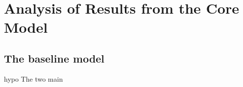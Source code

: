 \chapter{Analysis of Results from the Core Model} \label{chapter-analysis}


\section{The baseline model}hypo
The two main 
